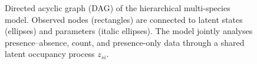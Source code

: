 \begin{figure}[htbp]
\caption{Directed acyclic graph (DAG) of the hierarchical multi-species
model. Observed nodes (rectangles) are connected to latent states (ellipses)
and parameters (italic ellipses). The model jointly analyses presence--absence,
count, and presence-only data through a shared latent occupancy process $z_{si}$.}
\label{fig:model}
\end{figure}
